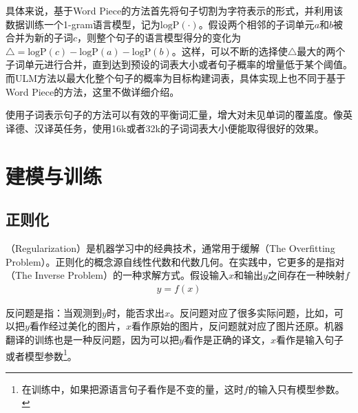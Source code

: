 \parinterval 具体来说，基于Word Piece的方法首先将句子切割为字符表示的形式\cite{6289079}，并利用该数据训练一个1-gram语言模型，记为$\textrm{logP}(\cdot)$。假设两个相邻的子词单元$a$和$b$被合并为新的子词$c$，则整个句子的语言模型得分的变化为$\triangle=\textrm{logP}(c)-\textrm{logP}(a)-\textrm{logP}(b)$。这样，可以不断的选择使$\triangle$最大的两个子词单元进行合并，直到达到预设的词表大小或者句子概率的增量低于某个阈值。而ULM方法以最大化整个句子的概率为目标构建词表\cite{DBLP:conf/acl/Kudo18}，具体实现上也不同于基于Word Piece的方法，这里不做详细介绍。

\parinterval 使用子词表示句子的方法可以有效的平衡词汇量，增大对未见单词的覆盖度。像英译德、汉译英任务，使用16k或者32k的子词词表大小便能取得很好的效果。

\vspace{-0.5em}
\sectionnewpage
\section{建模与训练}


\subsection{正则化}
\label{subsection-7.3.1}

（Regularization）是机器学习中的经典技术，通常用于缓解{\small{}}（The Overfitting Problem）。正则化的概念源自线性代数和代数几何。在实践中，它更多的是指对{\small{}}（The Inverse Problem）的一种求解方式。假设输入$x$和输出$y$之间存在一种映射$f$
\begin{eqnarray}
y = f(x)
\label{eq:7-1}
\end{eqnarray}

\noindent 反问题是指：当观测到$y$时，能否求出$x$。反问题对应了很多实际问题，比如，可以把$y$看作经过美化的图片，$x$看作原始的图片，反问题就对应了图片还原。机器翻译的训练也是一种反问题，因为可以把$y$看作是正确的译文，$x$看作是输入句子或者模型参数\footnote{在训练中，如果把源语言句子看作是不变的量，这时$f$的输入只有模型参数。}。

